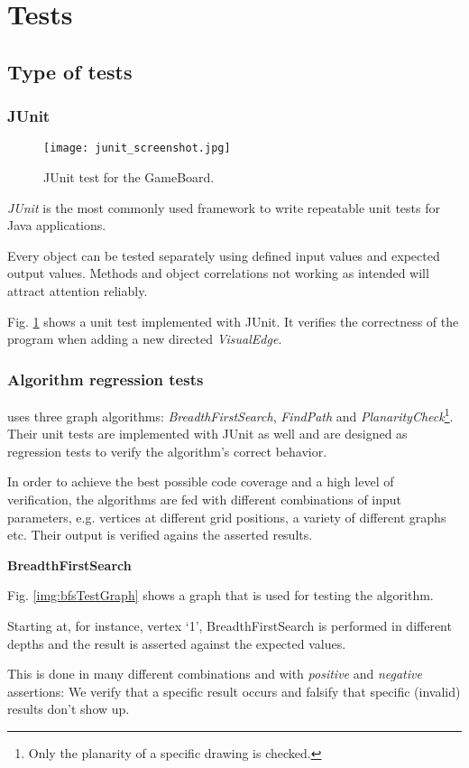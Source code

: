\section{Tests}
\label{section:tests}

\subsection{Type of tests}

\subsubsection{JUnit}

\begin{figure}[h]
	\centering
	\texttt{[image: junit\_screenshot.jpg]}
	\caption{JUnit test for the GameBoard.}
	\label{img:screenJUnit}
\end{figure}
\emph{JUnit} is the most commonly used framework to write repeatable unit tests for Java applications.\par
Every object can be tested separately using defined input values and expected output values. Methods and object correlations not working as intended will attract attention reliably.\par
Fig. \ref{img:screenJUnit} shows a unit test implemented with JUnit. It verifies the correctness of the program when adding a new directed \emph{VisualEdge}.

\subsubsection{Algorithm regression tests}

\graphioli uses three graph algorithms: \emph{BreadthFirstSearch}, \emph{FindPath} and \emph{PlanarityCheck}\footnote{Only the planarity of a specific drawing is checked.}. Their unit tests are implemented with JUnit as well and are designed as regression tests to verify the algorithm's correct behavior.\par
In order to achieve the best possible code coverage and a high level of verification, the algorithms are fed with different combinations of input parameters, e.g. vertices at different grid positions, a variety of different graphs etc. Their output is verified agains the asserted results.\par

\textbf{BreadthFirstSearch}\par
Fig. \ref{img:bfsTestGraph} shows a graph that is used for testing the algorithm.\par
Starting at, for instance, vertex `1', BreadthFirstSearch is performed in different depths and the result is asserted against the expected values.\par
This is done in many different combinations and with \emph{positive} and \emph{negative} assertions: We verify that a specific result occurs and falsify that specific (invalid) results don't show up.\par

